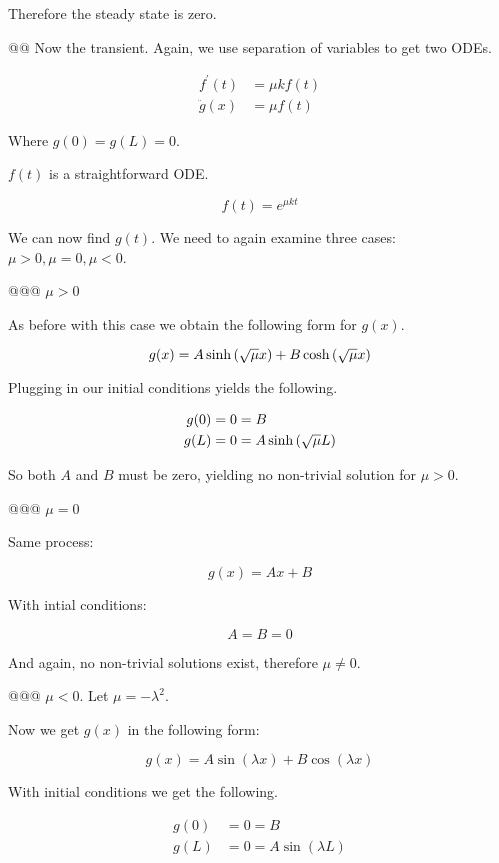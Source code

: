 \documentclass[10pt]{article}
\begin{document}
\begin{easylist}[enumerate]
    Therefore the steady state is zero.

    @@ Now the transient. Again, we use separation of variables to get two ODEs.

    \begin{align*}
        f^\prime(t) &= \mu k f(t)\\
        \ddot{g}(x) &= \mu f(t)
    \end{align*}

    Where $g(0) = g(L) = 0$.

    $f(t)$ is a straightforward ODE.

    \[
        f(t) = e^{\mu k t}
    \]

    We can now find $g(t)$. We need to again examine three cases: $\mu > 0, \mu = 0, \mu < 0$.

    @@@ $\mu > 0$

    As before with this case we obtain the following form for $g(x)$.

    \[
        g(x) = A \sinh\left( \sqrt{\mu} x \right) + B \cosh\left( \sqrt{\mu} x \right)
    \]

    Plugging in our initial conditions yields the following.

    \begin{align*}
        g(0) &= 0 = B\\
        g(L) &= 0 = A \sinh\left( \sqrt{\mu} L \right)
    \end{align*}

    So both $A$ and $B$ must be zero, yielding no non-trivial solution for $\mu > 0$.

    @@@ $\mu = 0$

    Same process:

    \[
        g(x) = Ax + B
    \]

    With intial conditions:

    \[
        A = B = 0
    \]

    And again, no non-trivial solutions exist, therefore $\mu \neq 0$.

    @@@ $\mu < 0$. Let $\mu = -\lambda^2$.

    Now we get $g(x)$ in the following form:

    \[
        g(x) = A \sin(\lambda x) + B \cos(\lambda x)
    \]

    With initial conditions we get the following.

    \begin{align*}
        g(0) &= 0 = B\\
        g(L) &= 0 = A \sin(\lambda L)
    \end{align*}


\end{easylist}
\end{document}

